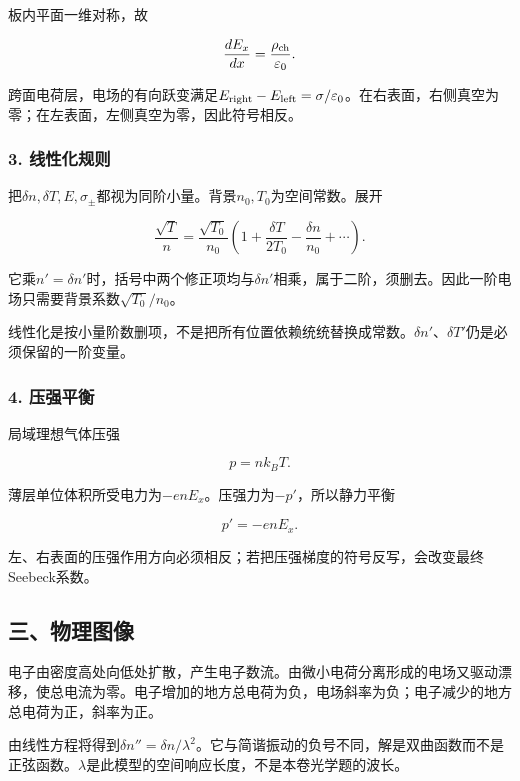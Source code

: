 \documentclass[12pt,a4paper,fontset=fandol]{ctexart}
\begin{document}
板内平面一维对称，故

\[
\frac{dE_x}{dx}=\frac{\rho_{\rm ch}}{\varepsilon_0}.
\]

跨面电荷层，电场的有向跃变满足\(E_{\rm right}-E_{\rm left}=\sigma/\varepsilon_0\)。在右表面，右侧真空为零；在左表面，左侧真空为零，因此符号相反。

\subsubsection{3. 线性化规则}\label{ux7ebfux6027ux5316ux89c4ux5219}

把\(\delta n,\delta T,E,\sigma_\pm\)都视为同阶小量。背景\(n_0,T_0\)为空间常数。展开

\[
\frac{\sqrt T}{n}
=\frac{\sqrt{T_0}}{n_0}
\left(1+\frac{\delta T}{2T_0}
-\frac{\delta n}{n_0}+\cdots\right).
\]

它乘\(n'=\delta n'\)时，括号中两个修正项均与\(\delta n'\)相乘，属于二阶，须删去。因此一阶电场只需要背景系数\(\sqrt{T_0}/n_0\)。

线性化是按小量阶数删项，不是把所有位置依赖统统替换成常数。\(\delta n'\)、\(\delta T'\)仍是必须保留的一阶变量。

\subsubsection{4. 压强平衡}\label{ux538bux5f3aux5e73ux8861}

局域理想气体压强

\[
p=nk_BT.
\]

薄层单位体积所受电力为\(-enE_x\)。压强力为\(-p'\)，所以静力平衡

\[
p'=-enE_x.
\]

左、右表面的压强作用方向必须相反；若把压强梯度的符号反写，会改变最终Seebeck系数。

\subsection{三、物理图像}\label{ux4e09ux7269ux7406ux56feux50cf-5}

电子由密度高处向低处扩散，产生电子数流。由微小电荷分离形成的电场又驱动漂移，使总电流为零。电子增加的地方总电荷为负，电场斜率为负；电子减少的地方总电荷为正，斜率为正。

由线性方程将得到\(\delta n''=\delta n/\lambda^2\)。它与简谐振动的负号不同，解是双曲函数而不是正弦函数。\(\lambda\)是此模型的空间响应长度，不是本卷光学题的波长。
\end{document}
